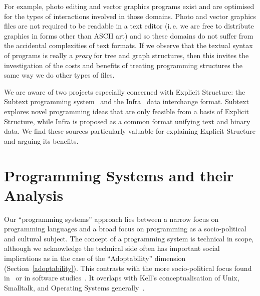 \documentclass[ twoside,openright,titlepage,numbers=noenddot,headinclude,footinclude,cleardoublepage=empty,abstract=on,
                BCOR=5mm,paper=a4,fontsize=11pt
                ]{scrreprt}
\newcommand{\ie}{i.\,e.}
\newcommand{\joel}[1]{}
\theoremstyle{definition}
\begin{document}
For example, photo editing and vector graphics programs exist and are
optimised for the types of interactions involved in those domains. Photo
and vector graphics files are not required to be readable in a text
editor (\ie{} we are free to distribute graphics in forms other than
ASCII art) and so these domains do not suffer from the accidental
complexities of text formats. If we observe that the textual syntax of
programs is really a \emph{proxy} for tree and graph structures, then
this invites the investigation of the costs and benefits of treating
programming structures the same way we do other types of files.

We are aware of two projects especially concerned with Explicit
Structure: the Subtext programming system~\parencite{Subtext} and the
Infra~\parencite{Infra} data interchange format. Subtext explores novel
programming ideas that are only feasible from a basis of Explicit
Structure, while Infra is proposed as a common format unifying text and
binary data. We find these sources particularly valuable for explaining
Explicit Structure and arguing its benefits.

\joel{
# Against Conventional Wisdom
A plausible hypothesis about *why* programming is the way it is---and hence why this thesis has a novel contribution to make---concerns a mismatch between programming's *military-industrial* history and its modern potential for *personal* computing. This is the logic behind the work of Kell and Basman.
\cite{Kell-os}
\cite{Externalise}
\cite{Kell-mmm}
\cite{OAP}
\cite{Entangle}
\cite{Entangle-critique}
\cite{TcherDiss}
\cite{SwStudies}
\cite{Wisdom}
\cite{Top}
}

\hypertarget{programming-systems-and-their-analysis}{\section{Programming Systems and their
Analysis}\label{programming-systems-and-their-analysis}}

Our ``programming systems'' approach lies between a narrow focus on
programming languages and a broad focus on programming as a
socio-political and cultural subject. The concept of a programming
system is technical in scope, although we acknowledge the technical side
often has important social implications as in the case of the
``Adoptability'' dimension (Section~\ref{adoptability}). This contrasts
with the more socio-political focus found in~\textcite{TcherDiss} or in
software studies~\parencite{SwStudies}. It overlaps with Kell's
conceptualisation of Unix, Smalltalk, and Operating Systems
generally~\parencite{Kell-OS}.
\end{document}
